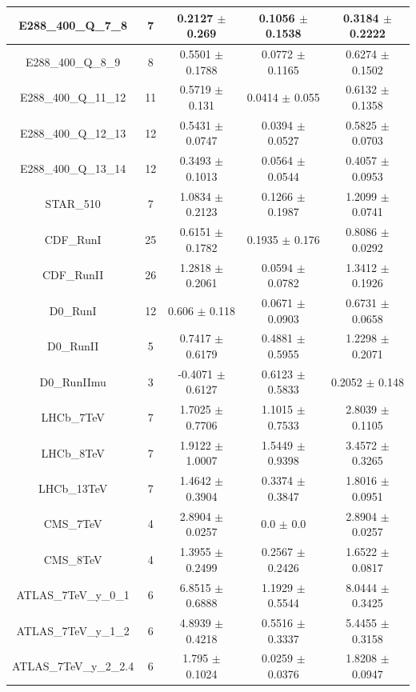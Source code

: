 \documentclass[
]{article}
\begin{document}
\begin{table}[h]
\begin{tabular}{|c|c|c|c|c|}
E288\_400\_Q\_7\_8 & 7 & 0.2127 \(\pm\) 0.269 & 0.1056 \(\pm\)
0.1538 & 0.3184 \(\pm\) 0.2222 \\ \hline
E288\_400\_Q\_8\_9 & 8 & 0.5501 \(\pm\) 0.1788 & 0.0772 \(\pm\)
0.1165 & 0.6274 \(\pm\) 0.1502 \\ \hline
E288\_400\_Q\_11\_12 & 11 & 0.5719 \(\pm\) 0.131 & 0.0414 \(\pm\)
0.055 & 0.6132 \(\pm\) 0.1358 \\ \hline
E288\_400\_Q\_12\_13 & 12 & 0.5431 \(\pm\) 0.0747 & 0.0394 \(\pm\)
0.0527 & 0.5825 \(\pm\) 0.0703 \\ \hline
E288\_400\_Q\_13\_14 & 12 & 0.3493 \(\pm\) 0.1013 & 0.0564 \(\pm\)
0.0544 & 0.4057 \(\pm\) 0.0953 \\ \hline
STAR\_510 & 7 & 1.0834 \(\pm\) 0.2123 & 0.1266 \(\pm\) 0.1987 & 1.2099
\(\pm\) 0.0741 \\ \hline
CDF\_RunI & 25 & 0.6151 \(\pm\) 0.1782 & 0.1935 \(\pm\) 0.176 & 0.8086
\(\pm\) 0.0292 \\ \hline
CDF\_RunII & 26 & 1.2818 \(\pm\) 0.2061 & 0.0594 \(\pm\) 0.0782 & 1.3412
\(\pm\) 0.1926 \\ \hline
D0\_RunI & 12 & 0.606 \(\pm\) 0.118 & 0.0671 \(\pm\) 0.0903 & 0.6731
\(\pm\) 0.0658 \\ \hline
D0\_RunII & 5 & 0.7417 \(\pm\) 0.6179 & 0.4881 \(\pm\) 0.5955 & 1.2298
\(\pm\) 0.2071 \\ \hline
D0\_RunIImu & 3 & -0.4071 \(\pm\) 0.6127 & 0.6123 \(\pm\)
0.5833 & 0.2052 \(\pm\) 0.148 \\ \hline
LHCb\_7TeV & 7 & 1.7025 \(\pm\) 0.7706 & 1.1015 \(\pm\) 0.7533 & 2.8039
\(\pm\) 0.1105 \\ \hline
LHCb\_8TeV & 7 & 1.9122 \(\pm\) 1.0007 & 1.5449 \(\pm\) 0.9398 & 3.4572
\(\pm\) 0.3265 \\ \hline
LHCb\_13TeV & 7 & 1.4642 \(\pm\) 0.3904 & 0.3374 \(\pm\) 0.3847 & 1.8016
\(\pm\) 0.0951 \\ \hline
CMS\_7TeV & 4 & 2.8904 \(\pm\) 0.0257 & 0.0 \(\pm\) 0.0 & 2.8904 \(\pm\)
0.0257 \\ \hline
CMS\_8TeV & 4 & 1.3955 \(\pm\) 0.2499 & 0.2567 \(\pm\) 0.2426 & 1.6522
\(\pm\) 0.0817 \\ \hline
ATLAS\_7TeV\_y\_0\_1 & 6 & 6.8515 \(\pm\) 0.6888 & 1.1929 \(\pm\)
0.5544 & 8.0444 \(\pm\) 0.3425 \\ \hline
ATLAS\_7TeV\_y\_1\_2 & 6 & 4.8939 \(\pm\) 0.4218 & 0.5516 \(\pm\)
0.3337 & 5.4455 \(\pm\) 0.3158 \\ \hline
ATLAS\_7TeV\_y\_2\_2.4 & 6 & 1.795 \(\pm\) 0.1024 & 0.0259 \(\pm\)
0.0376 & 1.8208 \(\pm\) 0.0947 \\ \hline

\end{tabular}
\end{table}
\end{document}
